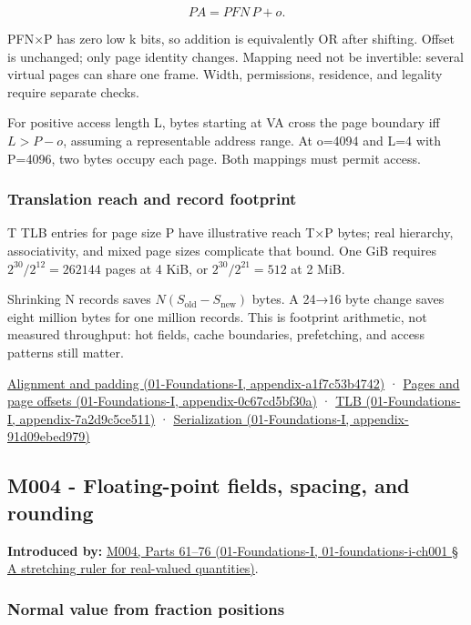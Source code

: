 \[
PA=PFN\,P+o.
\]

PFN×P has zero low k bits, so addition is equivalently OR after shifting. Offset is unchanged; only page identity changes. Mapping need not be invertible: several virtual pages can share one frame. Width, permissions, residence, and legality require separate checks.

For positive access length L, bytes starting at VA cross the page boundary iff \(L>P-o\), assuming a representable address range. At o=4094 and L=4 with P=4096, two bytes occupy each page. Both mappings must permit access.

\subsubsection{Translation reach and record footprint}\label{translation-reach-and-record-footprint}

T TLB entries for page size P have illustrative reach T×P bytes; real hierarchy, associativity, and mixed page sizes complicate that bound. One GiB requires \(2^{30}/2^{12}=262144\) pages at 4 KiB, or \(2^{30}/2^{21}=512\) at 2 MiB.

Shrinking N records saves \(N(S_{\mathrm{old}}-S_{\mathrm{new}})\) bytes. A 24→16 byte change saves eight million bytes for one million records. This is footprint arithmetic, not measured throughput: hot fields, cache boundaries, prefetching, and access patterns still matter.

\href{}{Alignment and padding (01-Foundations-I, appendix-a1f7c53b4742)} · \href{}{Pages and page offsets (01-Foundations-I, appendix-0c67cd5bf30a)} · \href{}{TLB (01-Foundations-I, appendix-7a2d9c5ce511)} · \href{}{Serialization (01-Foundations-I, appendix-91d09ebed979)}

\subsection{M004 - Floating-point fields, spacing, and rounding}\label{m004---floating-point-fields-spacing-and-rounding}

\textbf{Introduced by:} \href{}{M004, Parts 61--76 (01-Foundations-I, 01-foundations-i-ch001 § A stretching ruler for real-valued quantities)}.

\subsubsection{Normal value from fraction positions}\label{normal-value-from-fraction-positions}

